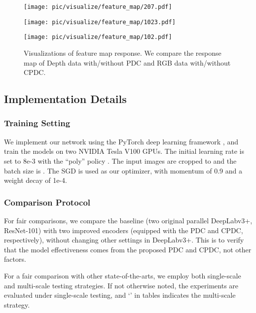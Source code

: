 \documentclass[lettersize,journal]{IEEEtran}
\begin{document}
\begin{figure*}
    \centering
    \begin{minipage}[c]{1\linewidth}
        \texttt{[image: pic/visualize/feature\_map/207.pdf]}
    \end{minipage}
    \begin{minipage}[c]{1\linewidth}
        \texttt{[image: pic/visualize/feature\_map/1023.pdf]}
    \end{minipage}
        \begin{minipage}[c]{1\linewidth}
        \texttt{[image: pic/visualize/feature\_map/102.pdf]}
    \end{minipage}
    \caption{Visualizations of feature map response. We compare the response map of Depth data with/without PDC and RGB data with/without CPDC.}
    \label{feature_map}
\end{figure*}



\subsection{Implementation Details}
\subsubsection{Training Setting} We implement our network using the PyTorch deep learning framework \cite{paszke2019pytorch}, and train the models on two NVIDIA Tesla V100 GPUs. The initial learning rate is set to 8e-3 with the ``poly” policy \cite{liu2015parsenet}. The input images are cropped to  and the batch size is . The SGD is used as our optimizer, with momentum of 0.9 and a weight decay of 1e-4.

\subsubsection{Comparison Protocol} For fair comparisons, we compare the baseline (two original parallel DeepLabv3+, ResNet-101) \cite{chen2018encoder} with two improved encoders (equipped with the PDC and CPDC, respectively), without changing other settings in DeepLabv3+. This is to verify that the model effectiveness comes from the proposed PDC and CPDC, not other factors.

For a fair comparison with other state-of-the-arts, we employ both single-scale and multi-scale testing strategies. If not otherwise noted, the experiments are evaluated under single-scale testing, and `' in tables indicates the multi-scale strategy.
\end{document}
